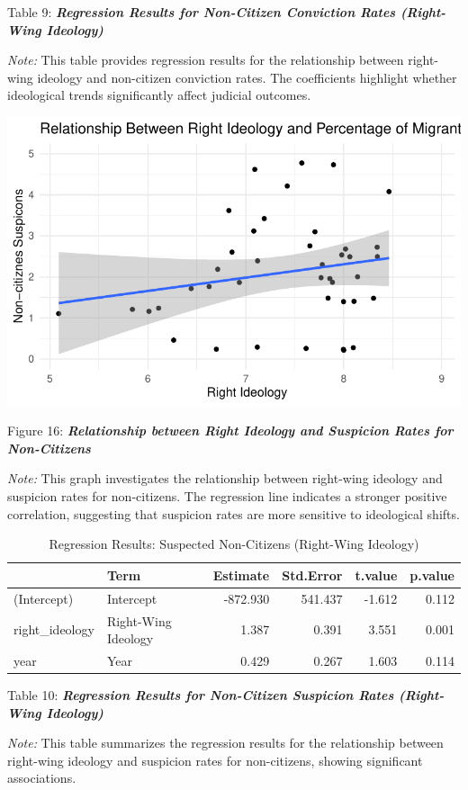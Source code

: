 \documentclass[
]{article}
\begin{document}
Table 9: \textbf{\emph{Regression Results for Non-Citizen Conviction
Rates (Right-Wing Ideology)}}

\emph{Note:} This table provides regression results for the relationship
between right-wing ideology and non-citizen conviction rates. The
coefficients highlight whether ideological trends significantly affect
judicial outcomes.

\includegraphics{DataMan_Project_files/figure-pdf/unnamed-chunk-49-1.pdf}

Figure 16: \textbf{\emph{Relationship between Right Ideology and
Suspicion Rates for Non-Citizens}}

\emph{Note:} This graph investigates the relationship between right-wing
ideology and suspicion rates for non-citizens. The regression line
indicates a stronger positive correlation, suggesting that suspicion
rates are more sensitive to ideological shifts.

\begin{table}
\centering
\caption{Regression Results: Suspected Non-Citizens (Right-Wing Ideology)}
\centering
\begin{tabular}[t]{l|l|r|r|r|r}
\hline
  & Term & Estimate & Std.Error & t.value & p.value\\
\hline
(Intercept) & Intercept & -872.930 & 541.437 & -1.612 & 0.112\\
\hline
right\_ideology & Right-Wing Ideology & 1.387 & 0.391 & 3.551 & 0.001\\
\hline
year & Year & 0.429 & 0.267 & 1.603 & 0.114\\
\hline
\end{tabular}
\end{table}

Table 10: \textbf{\emph{Regression Results for Non-Citizen Suspicion
Rates (Right-Wing Ideology)}}

\emph{Note:} This table summarizes the regression results for the
relationship between right-wing ideology and suspicion rates for
non-citizens, showing significant associations.
\end{document}
